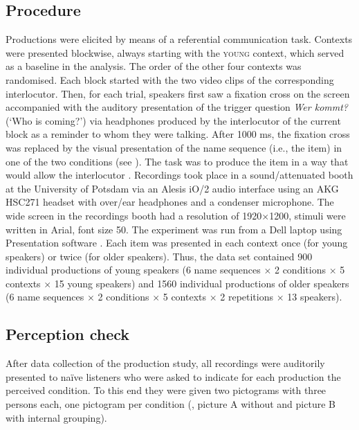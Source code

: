 \documentclass[output=paper]{langscibook}
\begin{document}
\subsection{Procedure}\largerpage
Productions were elicited by means of a referential communication task. Contexts were presented blockwise, always starting with the \textsc{young} context, which served as a baseline in the analysis. The order of the other four contexts was randomised. Each block started with the two video clips of the corresponding interlocutor. Then, for each trial, speakers first saw a fixation cross on the screen accompanied with the auditory presentation of the trigger question \textit{Wer kommt?} (`Who is coming?') via headphones produced by the interlocutor of the current block as a reminder to whom they were talking. After 1000 ms, the fixation cross was replaced by the visual presentation of the name sequence (i.e., the item) in one of the two conditions (see ). The task was to produce the item in a way that would allow the interlocutor . Recordings took place in a sound\-/attenuated booth at the University of Potsdam via an Alesis iO/2 audio interface using an AKG HSC271 headset with over\-/ear headphones and a condenser microphone. The wide screen in the recordings booth had a resolution of 1920$\times$1200, stimuli were written in Arial, font size 50. The experiment was run from a Dell laptop using Presentation software \citep{noauthor_neurobehavioural_2018}.
Each item was presented in each context once (for young speakers) or twice (for older speakers). Thus, the data set contained 900 individual productions of young speakers (6 name sequences $\times$ 2 conditions $\times$ 5 contexts $\times$ 15 young speakers) and 1560 individual productions of older speakers (6 name sequences $\times$ 2 conditions $\times$ 5 contexts $\times$ 2 repetitions $\times$ 13 speakers).


\subsection{Perception check}\largerpage
After data collection of the production study, all recordings were auditorily presented to na\"ive listeners who were asked to indicate for each production the perceived condition. To this end they were given two pictograms with three persons each, one pictogram per condition (, picture A without and picture B with internal grouping).
\end{document}
